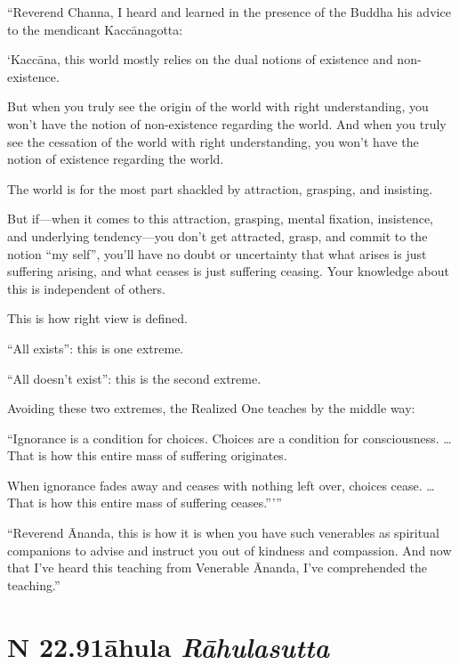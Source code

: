 \documentclass[12pt,openany]{book}%
\newcommand*{\suttatitleacronym}[1]{\smaller[2]{#1}\vspace*{.3em}}
\newcommand*{\suttatitletranslation}[1]{\linebreak{#1}}
\newcommand*{\suttatitleroot}[1]{\linebreak\smaller[2]\itshape{#1}}
\newcommand*{\tocacronym}[1]{\hspace*{-3.3em}{#1}\quad}
\newcommand*{\toctranslation}[1]{#1}
\newcommand*{\tocroot}[1]{(\textit{#1})}
\begin{document}
“Reverend Channa, I heard and learned in the presence of the Buddha his advice to the mendicant \textsanskrit{Kaccānagotta}: 

‘\textsanskrit{Kaccāna}, this world mostly relies on the dual notions of existence and non-existence. 

But when you truly see the origin of the world with right understanding, you won’t have the notion of non-existence regarding the world. And when you truly see the cessation of the world with right understanding, you won’t have the notion of existence regarding the world. 

The world is for the most part shackled by attraction, grasping, and insisting. 

But if—when it comes to this attraction, grasping, mental fixation, insistence, and underlying tendency—you don’t get attracted, grasp, and commit to the notion “my self”, you’ll have no doubt or uncertainty that what arises is just suffering arising, and what ceases is just suffering ceasing. Your knowledge about this is independent of others. 

This is how right view is defined. 

“All exists”: this is one extreme. 

“All doesn’t exist”: this is the second extreme. 

Avoiding these two extremes, the Realized One teaches by the middle way: 

“Ignorance is a condition for choices. Choices are a condition for consciousness. … That is how this entire mass of suffering originates. 

When ignorance fades away and ceases with nothing left over, choices cease. … That is how this entire mass of suffering ceases.”’” 

“Reverend Ānanda, this is how it is when you have such venerables as spiritual companions to advise and instruct you out of kindness and compassion. And now that I’ve heard this teaching from Venerable Ānanda, I’ve comprehended the teaching.” 

%
\section*{{\suttatitleacronym SN 22.91}{\suttatitletranslation Rāhula }{\suttatitleroot Rāhulasutta}}
\addcontentsline{toc}{section}{\tocacronym{SN 22.91} \toctranslation{Rāhula } \tocroot{Rāhulasutta}}
\end{document}
